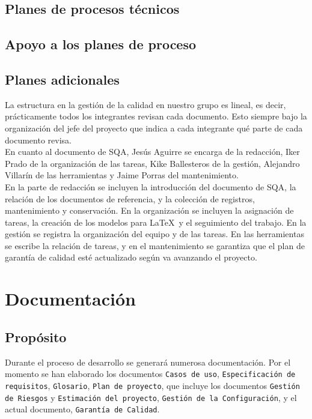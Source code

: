 \documentclass[spanish,a4paper,11pt, twoside]{report}	%
\begin{document}
	\section{ Planes de procesos técnicos}
	\section{Apoyo a los planes de proceso}
	\section{ Planes adicionales}

	La estructura en la gestión de la calidad en nuestro grupo es lineal, es decir, prácticamente todos los integrantes revisan cada documento. Esto siempre bajo la organización del 
	jefe del proyecto que indica a cada integrante qué parte de cada documento revisa.\\

	 En cuanto al documento de SQA, Jesús Aguirre se encarga de la redacción, Iker Prado de la organización de las tareas, Kike Ballesteros de la 
	gestión, Alejandro Villarín de las herramientas y Jaime Porras del mantenimiento.\\

	En la parte de redacción se incluyen  la introducción del documento de SQA, la relación de los documentos de referencia, y la colección de registros, mantenimiento y conservación. En la organización se incluyen  la asignación de tareas, 
	la creación de los modelos para \LaTeX \ y el seguimiento del trabajo. En la gestión se registra la organización del equipo y de las tareas. En las herramientas se escribe la relación de tareas, y en el mantenimiento se garantiza
	que el plan de garantía de calidad esté actualizado según va avanzando el proyecto.\\

	

\newpage
\mbox{}
\thispagestyle{empty}						%
\newpage

\chapter{ Documentación}%
	
	
	\section{Propósito}
			Durante el proceso de desarrollo se generará numerosa documentación.
		Por el momento se han elaborado los documentos \texttt{Casos de uso}, \texttt{Especificación de requisitos}, \texttt{Glosario}, \texttt{Plan de proyecto}, 
		que incluye los documentos \texttt{Gestión de Riesgos} y \texttt{Estimación del proyecto}, \texttt{Gestión de la Configuración}, 
		y el actual documento, \texttt{Garantía de Calidad}.
\end{document}

